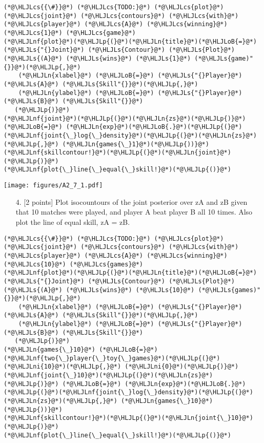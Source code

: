 \documentclass[12pt,a4paper]{article}
\newcommand{\HLJLn}[1]{#1}
\newcommand{\HLJLnf}[1]{\textcolor[RGB]{66,102,213}{#1}}
\newcommand{\HLJLs}[1]{\textcolor[RGB]{201,61,57}{#1}}
\newcommand{\HLJLni}[1]{\textcolor[RGB]{59,151,46}{#1}}
\newcommand{\HLJLoB}[1]{\textcolor[RGB]{102,102,102}{\textbf{#1}}}
\newcommand{\HLJLp}[1]{#1}
\newcommand{\HLJLcs}[1]{\textcolor[RGB]{153,153,119}{\textit{#1}}}
\begin{document}
\begin{lstlisting}
(*@\HLJLcs{{\#}}@*) (*@\HLJLcs{TODO:}@*) (*@\HLJLcs{plot}@*) (*@\HLJLcs{joint}@*) (*@\HLJLcs{contours}@*) (*@\HLJLcs{with}@*) (*@\HLJLcs{player}@*) (*@\HLJLcs{A}@*) (*@\HLJLcs{winning}@*) (*@\HLJLcs{1}@*) (*@\HLJLcs{game}@*)
(*@\HLJLnf{plot}@*)(*@\HLJLp{(}@*)(*@\HLJLn{title}@*)(*@\HLJLoB{=}@*)(*@\HLJLs{"{}Joint}@*) (*@\HLJLs{Contour}@*) (*@\HLJLs{Plot}@*) (*@\HLJLs{(A}@*) (*@\HLJLs{wins}@*) (*@\HLJLs{1}@*) (*@\HLJLs{game)"{}}@*)(*@\HLJLp{,}@*)
    (*@\HLJLn{xlabel}@*) (*@\HLJLoB{=}@*) (*@\HLJLs{"{}Player}@*) (*@\HLJLs{A}@*) (*@\HLJLs{Skill"{}}@*)(*@\HLJLp{,}@*)
    (*@\HLJLn{ylabel}@*) (*@\HLJLoB{=}@*) (*@\HLJLs{"{}Player}@*) (*@\HLJLs{B}@*) (*@\HLJLs{Skill"{}}@*)
   (*@\HLJLp{)}@*)
(*@\HLJLnf{joint}@*)(*@\HLJLp{(}@*)(*@\HLJLn{zs}@*)(*@\HLJLp{)}@*) (*@\HLJLoB{=}@*) (*@\HLJLn{exp}@*)(*@\HLJLoB{.}@*)(*@\HLJLp{(}@*)(*@\HLJLnf{joint{\_}log{\_}density}@*)(*@\HLJLp{(}@*)(*@\HLJLn{zs}@*)(*@\HLJLp{,}@*) (*@\HLJLn{games{\_}1}@*)(*@\HLJLp{))}@*)
(*@\HLJLnf{skillcontour!}@*)(*@\HLJLp{(}@*)(*@\HLJLn{joint}@*)(*@\HLJLp{)}@*)
(*@\HLJLnf{plot{\_}line{\_}equal{\_}skill!}@*)(*@\HLJLp{()}@*)
\end{lstlisting}

\texttt{[image: figures/A2\_7\_1.pdf]}

\begin{itemize}
\item[4. ] [2 points] Plot isocountours of the joint posterior over zA and zB given that 10 matches were played, and player A beat player B all 10 times. Also plot the line of equal skill, zA = zB.

\end{itemize}

\begin{lstlisting}
(*@\HLJLcs{{\#}}@*) (*@\HLJLcs{TODO:}@*) (*@\HLJLcs{plot}@*) (*@\HLJLcs{joint}@*) (*@\HLJLcs{contours}@*) (*@\HLJLcs{with}@*) (*@\HLJLcs{player}@*) (*@\HLJLcs{A}@*) (*@\HLJLcs{winning}@*) (*@\HLJLcs{10}@*) (*@\HLJLcs{games}@*)
(*@\HLJLnf{plot}@*)(*@\HLJLp{(}@*)(*@\HLJLn{title}@*)(*@\HLJLoB{=}@*)(*@\HLJLs{"{}Joint}@*) (*@\HLJLs{Contour}@*) (*@\HLJLs{Plot}@*) (*@\HLJLs{(A}@*) (*@\HLJLs{wins}@*) (*@\HLJLs{10}@*) (*@\HLJLs{games)"{}}@*)(*@\HLJLp{,}@*)
    (*@\HLJLn{xlabel}@*) (*@\HLJLoB{=}@*) (*@\HLJLs{"{}Player}@*) (*@\HLJLs{A}@*) (*@\HLJLs{Skill"{}}@*)(*@\HLJLp{,}@*)
    (*@\HLJLn{ylabel}@*) (*@\HLJLoB{=}@*) (*@\HLJLs{"{}Player}@*) (*@\HLJLs{B}@*) (*@\HLJLs{Skill"{}}@*)
   (*@\HLJLp{)}@*)
(*@\HLJLn{games{\_}10}@*) (*@\HLJLoB{=}@*) (*@\HLJLnf{two{\_}player{\_}toy{\_}games}@*)(*@\HLJLp{(}@*)(*@\HLJLni{10}@*)(*@\HLJLp{,}@*) (*@\HLJLni{0}@*)(*@\HLJLp{)}@*)
(*@\HLJLnf{joint{\_}10}@*)(*@\HLJLp{(}@*)(*@\HLJLn{zs}@*)(*@\HLJLp{)}@*) (*@\HLJLoB{=}@*) (*@\HLJLn{exp}@*)(*@\HLJLoB{.}@*)(*@\HLJLp{(}@*)(*@\HLJLnf{joint{\_}log{\_}density}@*)(*@\HLJLp{(}@*)(*@\HLJLn{zs}@*)(*@\HLJLp{,}@*) (*@\HLJLn{games{\_}10}@*)(*@\HLJLp{))}@*)
(*@\HLJLnf{skillcontour!}@*)(*@\HLJLp{(}@*)(*@\HLJLn{joint{\_}10}@*)(*@\HLJLp{)}@*)
(*@\HLJLnf{plot{\_}line{\_}equal{\_}skill!}@*)(*@\HLJLp{()}@*)
\end{lstlisting}
\end{document}

